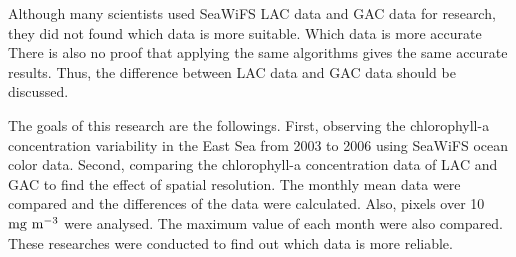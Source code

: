 Although many scientists used SeaWiFS LAC data and GAC data for research, they did not found which data is more suitable. Which data is more accurate There is also no proof that applying the same algorithms gives the same accurate results. Thus, the difference between LAC data and GAC data should be discussed. 

The goals of this research are the followings. First, observing the chlorophyll-a concentration variability in the East Sea from 2003 to 2006 using SeaWiFS ocean color data. Second, comparing the chlorophyll-a concentration data of LAC and GAC to find the effect of spatial resolution. The monthly mean data were compared and the differences of the data were calculated. Also, pixels over 10 $\rm mg~m^{-3}$ were analysed. The maximum value of each month were also compared. These researches were conducted to find out which data is more reliable.

